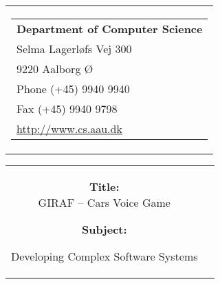 \thispagestyle{empty}
\pagestyle{empty}
\begin{titlepage}
\begin{nopagebreak}
{\samepage 
\begin{tabular}{r}
	\parbox{16cm}{
	\hfill \parbox{7cm}{\begin{tabular}{l}
		{\small \textbf{Department of Computer Science}}\\
		{\small Selma Lagerløfs Vej 300} \\
		{\small 9220 Aalborg Ø} \\
		{\small Phone (+45) 9940 9940} \\
		{\small Fax (+45) 9940 9798} \\
		{\small \url{http://www.cs.aau.dk}}
	\end{tabular}}
	}
\end{tabular}

\begin{tabular}{cc}
	\parbox{8cm}{
	\begin{description}
		\item { \textbf{Title:}}\\ 
			GIRAF -- Cars Voice Game
    		\item { \textbf{Subject:}}\\ 
			\raggedright Developing Complex Software Systems
	\end{description}
	
}
\end{tabular}}
\end{nopagebreak}
\end{titlepage}
